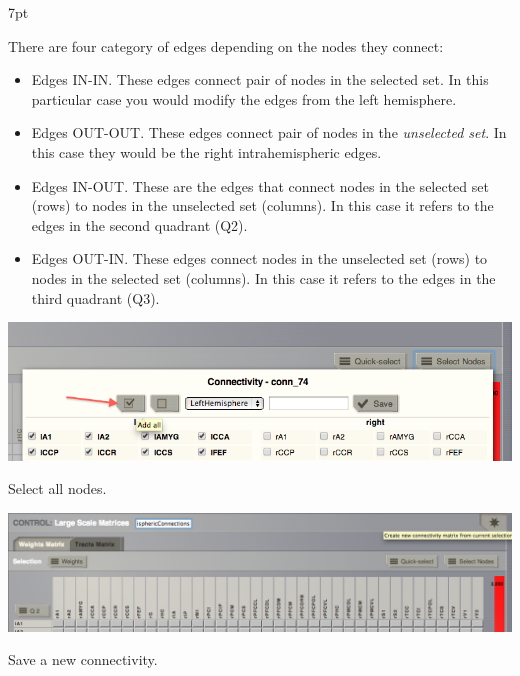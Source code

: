 \documentclass{tufte-handout}
\newenvironment{blah}{%
  \def\FrameCommand{%
    \hspace{1pt}%
    {\color{DarkOrange}\vrule width 2pt}%
    {\color{PeachPuff}\vrule width 4pt}%
    \colorbox{PeachPuff}%
  }%
  \MakeFramed{\advance\hsize-\width\FrameRestore}%
  \noindent\hspace{-4.55pt}%
  \begin{adjustwidth}{}{7pt}%
  \vspace{2pt}\vspace{2pt}%
}
{%
  \vspace{2pt}\end{adjustwidth}\endMakeFramed%
}
\begin{document}
\begin{blah}
There are four category of edges depending on the nodes they connect:
\begin{itemize}
  \item Edges IN-IN. These edges connect pair of nodes in the selected set. In this
  particular case you would modify the edges from the left hemisphere.
  \item Edges OUT-OUT. These edges connect pair of nodes in the \textit{unselected
  set}. In this case they would be the right intrahemispheric edges.
  \item Edges IN-OUT. These are the edges that connect nodes in the selected set
  (rows) to nodes in the unselected set (columns). In this case it refers to
  the edges in the second quadrant (Q2).
  \item Edges OUT-IN. These edges connect nodes in the unselected set (rows) to
  nodes in the selected set (columns). In this case it refers to the edges in the third
  quadrant (Q3).
\end{itemize}
\end{blah}


\begin{marginfigure}%
  \includegraphics[width=\linewidth]{Handout_UI_ModellingStructuralLesions_SelectAllNodes}
    \caption{Select all nodes.}
  \label{fig:steps_selectall}
  \end{marginfigure}
  \begin{marginfigure}
 \includegraphics[width=\linewidth]{Handout_UI_ModellingStructuralLesions_SaveNewMatrix}
  \caption{Save a new connectivity.}
  \label{fig:steps_savenew}
\end{marginfigure}
\end{document}
